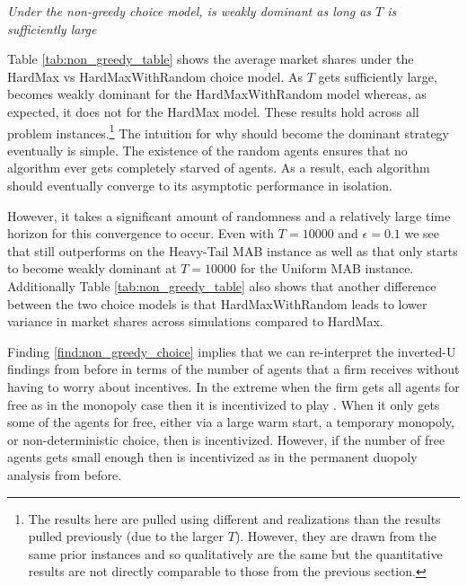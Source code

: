 \documentclass[../competing_bandits.tex]{subfiles}
\begin{document}
\normalsize


\begin{finding}\label{find:non_greedy_choice}
\textit{Under the non-greedy choice model, \TS is weakly dominant as long as $T$ is sufficiently large}
\end{finding}


Table \ref{tab:non_greedy_table} shows the average market shares under the HardMax vs HardMaxWithRandom choice model. As $T$ gets sufficiently large, \TS becomes weakly dominant for the HardMaxWithRandom model whereas, as expected, it does not for the HardMax model. These results hold across all problem instances.\footnote{The results here are pulled using different \MRV and realizations than the results pulled previously (due to the larger $T$). However, they are drawn from the same prior instances and so qualitatively are the same but the quantitative results are not directly comparable to those from the previous section.} The intuition for why \TS should become the dominant strategy eventually is simple. The existence of the random agents ensures that no algorithm ever gets completely starved of agents. As a result, each algorithm should eventually converge to its asymptotic performance in isolation.

However, it takes a significant amount of randomness and a relatively large time horizon for this convergence to occur. Even with $T = 10000$ and $\epsilon = 0.1$ we see that \DEG still outperforms \DG on the Heavy-Tail MAB instance as well as that \TS only starts to become weakly dominant at $T = 10000$ for the Uniform MAB instance. Additionally Table \ref{tab:non_greedy_table} also shows that another difference between the two choice models is that HardMaxWithRandom leads to lower variance in market shares across simulations compared to HardMax.

Finding \ref{find:non_greedy_choice} implies that we can re-interpret the inverted-U findings from before in terms of the number of agents that a firm receives without having to worry about incentives. In the extreme when the firm gets all agents for free as in the monopoly case then it is incentivized to play \DG. When it only gets some of the agents for free, either via a large warm start, a temporary monopoly, or non-deterministic choice, then \TS is incentivized. However, if the number of free agents gets small enough then \DG is incentivized as in the permanent duopoly analysis from before.
\end{document}

